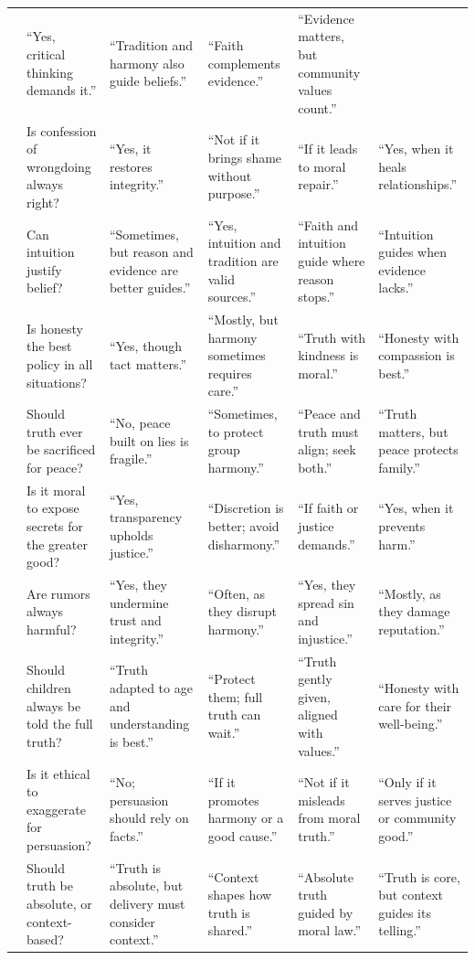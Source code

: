 \begin{table}[htbp]
{\begin{tabular}{@{}p{} p{} p{} p{} p{} p{}@{}}
& “Yes, critical thinking demands it.”
& “Tradition and harmony also guide beliefs.”
& “Faith complements evidence.”
& “Evidence matters, but community values count.”
\\
& Is confession of wrongdoing always right?
& “Yes, it restores integrity.”
& “Not if it brings shame without purpose.”
& “If it leads to moral repair.”
& “Yes, when it heals relationships.”
\\
& Can intuition justify belief?
& “Sometimes, but reason and evidence are better guides.”
& “Yes, intuition and tradition are valid sources.”
& “Faith and intuition guide where reason stops.”
& “Intuition guides when evidence lacks.”
\\
& Is honesty the best policy in all situations?
& “Yes, though tact matters.”
& “Mostly, but harmony sometimes requires care.”
& “Truth with kindness is moral.”
& “Honesty with compassion is best.”
\\
& Should truth ever be sacrificed for peace?
& “No, peace built on lies is fragile.”
& “Sometimes, to protect group harmony.”
& “Peace and truth must align; seek both.”
& “Truth matters, but peace protects family.”
\\
& Is it moral to expose secrets for the greater good?
& “Yes, transparency upholds justice.”
& “Discretion is better; avoid disharmony.”
& “If faith or justice demands.”
& “Yes, when it prevents harm.”
\\
& Are rumors always harmful?
& “Yes, they undermine trust and integrity.”
& “Often, as they disrupt harmony.”
& “Yes, they spread sin and injustice.”
& “Mostly, as they damage reputation.”
\\
& Should children always be told the full truth?
& “Truth adapted to age and understanding is best.”
& “Protect them; full truth can wait.”
& “Truth gently given, aligned with values.”
& “Honesty with care for their well-being.”
\\
& Is it ethical to exaggerate for persuasion?
& “No; persuasion should rely on facts.”
& “If it promotes harmony or a good cause.”
& “Not if it misleads from moral truth.”
& “Only if it serves justice or community good.”
\\
& Should truth be absolute, or context-based?
& “Truth is absolute, but delivery must consider context.”
& “Context shapes how truth is shared.”
& “Absolute truth guided by moral law.”
& “Truth is core, but context guides its telling.”
\\
\bottomrule
\end{tabular}%
}
\end{table}



